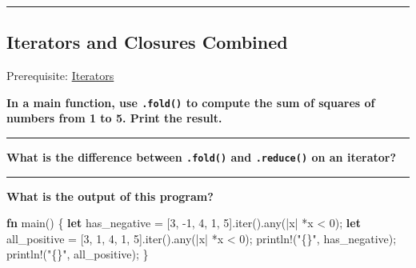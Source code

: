 \documentclass[
  11pt,
]{article}
\newenvironment{Shaded}{}{}
\newcommand{\DecValTok}[1]{\textcolor[rgb]{0.25,0.63,0.44}{#1}}
\newcommand{\KeywordTok}[1]{\textcolor[rgb]{0.00,0.44,0.13}{\textbf{#1}}}
\newcommand{\NormalTok}[1]{#1}
\newcommand{\OperatorTok}[1]{\textcolor[rgb]{0.40,0.40,0.40}{#1}}
\newcommand{\PreprocessorTok}[1]{\textcolor[rgb]{0.74,0.48,0.00}{#1}}
\newcommand{\StringTok}[1]{\textcolor[rgb]{0.25,0.44,0.63}{#1}}
\begin{document}
\begin{Shaded}
\begin{Highlighting}[]

\end{Highlighting}
\end{Shaded}

\begin{center}\rule{0.5\linewidth}{0.5pt}\end{center}

\subsection{Iterators and Closures
Combined}\label{iterators-and-closures-combined}

Prerequisite: \hyperref[iterators]{Iterators}

\textbf{In a main function, use \texttt{.fold()} to compute the sum of
squares of numbers from 1 to 5. Print the result.}

\begin{Shaded}
\begin{Highlighting}[]

\end{Highlighting}
\end{Shaded}

\begin{center}\rule{0.5\linewidth}{0.5pt}\end{center}

\textbf{What is the difference between \texttt{.fold()} and
\texttt{.reduce()} on an iterator?}

\begin{center}\rule{0.5\linewidth}{0.5pt}\end{center}

\textbf{What is the output of this program?}

\begin{Shaded}
\begin{Highlighting}[]
\KeywordTok{fn}\NormalTok{ main() }\OperatorTok{\{}
    \KeywordTok{let}\NormalTok{ has\_negative }\OperatorTok{=}\NormalTok{ [}\DecValTok{3}\OperatorTok{,} \OperatorTok{{-}}\DecValTok{1}\OperatorTok{,} \DecValTok{4}\OperatorTok{,} \DecValTok{1}\OperatorTok{,} \DecValTok{5}\NormalTok{]}\OperatorTok{.}\NormalTok{iter()}\OperatorTok{.}\NormalTok{any(}\OperatorTok{|}\NormalTok{x}\OperatorTok{|} \OperatorTok{*}\NormalTok{x }\OperatorTok{\textless{}} \DecValTok{0}\NormalTok{)}\OperatorTok{;}
    \KeywordTok{let}\NormalTok{ all\_positive }\OperatorTok{=}\NormalTok{ [}\DecValTok{3}\OperatorTok{,} \DecValTok{1}\OperatorTok{,} \DecValTok{4}\OperatorTok{,} \DecValTok{1}\OperatorTok{,} \DecValTok{5}\NormalTok{]}\OperatorTok{.}\NormalTok{iter()}\OperatorTok{.}\NormalTok{any(}\OperatorTok{|}\NormalTok{x}\OperatorTok{|} \OperatorTok{*}\NormalTok{x }\OperatorTok{\textless{}} \DecValTok{0}\NormalTok{)}\OperatorTok{;}
    \PreprocessorTok{println!}\NormalTok{(}\StringTok{"\{\}"}\OperatorTok{,}\NormalTok{ has\_negative)}\OperatorTok{;}
    \PreprocessorTok{println!}\NormalTok{(}\StringTok{"\{\}"}\OperatorTok{,}\NormalTok{ all\_positive)}\OperatorTok{;}
\OperatorTok{\}}
\end{Highlighting}
\end{Shaded}
\end{document}
